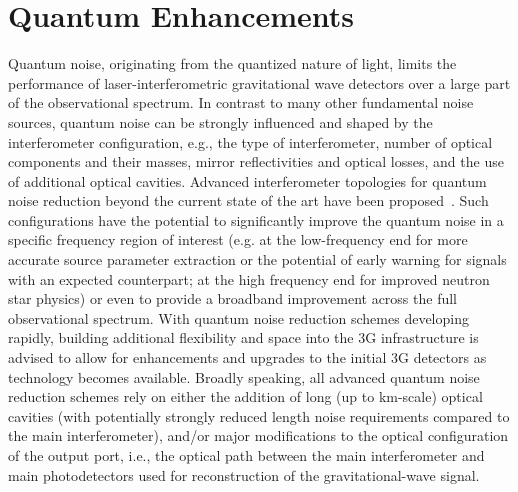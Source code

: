 \chapter{Quantum Enhancements}
\label{sec:Quantum}

\vspace{1 cm} 
Quantum noise, originating from the quantized nature of light, limits the performance of laser-interferometric gravitational wave detectors over a large part of the observational spectrum. In contrast to many other fundamental noise sources, quantum noise can be strongly influenced and shaped by the interferometer configuration, e.g., the type of interferometer, number of optical components and their masses, mirror reflectivities and optical losses, and the use of additional optical cavities. Advanced interferometer topologies for quantum noise reduction beyond the current state of the art have been proposed~\cite{Danilishin:2019dxq}. Such configurations have the potential to significantly improve the quantum noise in a specific frequency region of interest (e.g. at the low-frequency end for more accurate source parameter extraction or the potential of early warning for signals with an expected counterpart; at the high frequency end for improved neutron star physics) or even to provide a broadband improvement across the full observational spectrum. 
With quantum noise reduction schemes developing rapidly, building additional flexibility and space into the  \ac{3G}   infrastructure is advised to allow for enhancements and upgrades to the initial  \ac{3G}   detectors as technology becomes available. 
Broadly speaking, all advanced quantum noise reduction schemes rely on either the addition of long (up to km-scale) optical cavities (with potentially strongly reduced length noise requirements compared to the main interferometer), and/or major modifications to the optical configuration of the output port, i.e., the optical path between the main interferometer and main photodetectors used for reconstruction of the gravitational-wave signal. 
